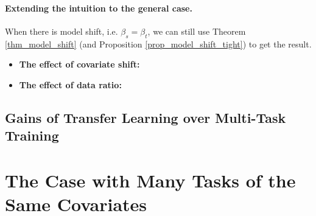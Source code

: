 \paragraph{Extending the intuition to the general case.}
When there is model shift, i.e. $\beta_s = \beta_t$, we can still use Theorem \ref{thm_model_shift} (and Proposition \ref{prop_model_shift_tight}) to get the result.
\begin{itemize}
	\item \textbf{The effect of covariate shift:}
	\item \textbf{The effect of data ratio:}
\end{itemize}



\subsection{Gains of Transfer Learning over Multi-Task Training}



\section{The Case with Many Tasks of the Same Covariates}















